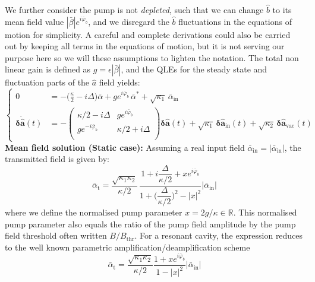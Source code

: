 We further consider the pump is not \textit{depleted}, such that we can change $\hat{b}$ to its mean field value $|\bar{\beta}|e^{i\bar{\varphi}_b}$, and we disregard the $\hat{b}$ fluctuations in the equations of motion for simplicity. A careful and complete derivations could also be carried out by keeping all terms in the equations of motion, but it is not serving our purpose here so we will these assumptions to lighten the notation. The total non linear gain is defined as $g = \epsilon |\bar\beta|$, and the QLEs for the steady state and fluctuation parts of the $\hat{a}$ field yields: 
 \begin{equation}
  \left\{
  \begin{split}
  0 &= -\Big(\frac{\kappa}{2}-i\Delta\Big) \bar{\alpha} +g e^{i\bar{\varphi}_b} \, \bar{\alpha}^* + \sqrt{\kappa_1} \, \bar{\alpha}_{\mathrm{in}} \\
  \mathbf{\delta \dot{\hat{a}}}(t)&= - \begin{pmatrix}
  \kappa/2-i\Delta & g e^{i\bar{\varphi}_b}\\
   g e^{-i\bar{\varphi}_b} & \kappa/2+i\Delta \\
  \end{pmatrix}  \mathbf{\delta \hat{a}}(t) + \sqrt{\kappa_{\mathrm{1}}} \, \mathbf{\delta \hat{a}_{\mathrm{in}}}(t)  + \sqrt{\kappa_2} \, \mathbf{\delta \hat{a}_{\mathrm{vac}}}(t)
  \end{split}
  \right.
\end{equation}
\noindent \textbf{Mean field solution (Static case): }Assuming a real input field $\bar{\alpha}_\textrm{in}=|\bar{\alpha}_\textrm{in}|$, the transmitted field is given by: 
\begin{equation}
   \bar{\alpha}_{\mathrm{t}} = \frac{\sqrt{\kappa_1\kappa_2}}{\kappa/2} \, \frac{1+i\dfrac{\Delta}{\kappa/2}+xe^{i\bar{\varphi}_b}}{1+\Big(\dfrac{\Delta}{\kappa/2}\Big)^2 - |x|^2}  |\bar{\alpha}_\textrm{in}|
\end{equation}
where we define the normalised pump parameter $x = 2g / \kappa \in\mathbb{R}$. This normalised pump parameter also equals the ratio of the pump field amplitude by the pump field threshold often written $B/B_{\mathrm{thr}}$. For a resonant cavity, the expression reduces to the well known parametric amplification/deamplification scheme 
\begin{equation}
   \bar{\alpha}_{\mathrm{t}} =  \frac{\sqrt{\kappa_1\kappa_2}}{\kappa/2}\frac{1+x e^{i\bar{\varphi}_b}}{1 - |x|^2} | \bar{\alpha}_\textrm{in} |
\end{equation}
